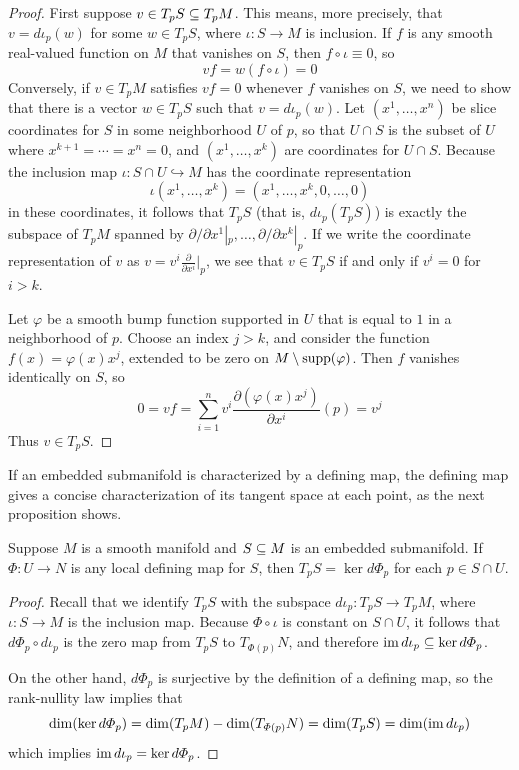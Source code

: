 \begin{proof}
First suppose $v\in T_pS\subseteq T_pM$. This means, more precisely, that $v=d\iota_p(w)$ for some $w\in T_pS$, where $\iota:S\to M$ is inclusion. If $f$ is any smooth real-valued function on $M$ that vanishes on $S$, then $f\circ\iota\equiv 0$, so
\[vf=w(f\circ\iota)=0\]
Conversely, if $v\in T_pM$ satisfies $vf=0$ whenever $f$ vanishes on $S$, we need to
show that there is a vector $w\in T_pS$ such that $v=d\iota_p(w)$. Let $(x^1,\dots,x^n)$ be slice coordinates for $S$ in some neighborhood $U$ of $p$, so that $U\cap S$ is the subset of $U$ where $x^{k+1}=\cdots=x^n=0$, and $(x^1,\dots,x^k)$ are coordinates for $U\cap S$. Because the inclusion map $\iota:S\cap U\hookrightarrow M$ has the coordinate representation
\[\iota(x^1,\dots,x^k)=(x^1,\dots,x^k,0,\dots,0)\]
in these coordinates, it follows that $T_pS$ (that is, $d\iota_p(T_pS)$) is exactly the subspace of $T_pM$ spanned by $\partial/\partial x^1|_p,\dots,\partial/\partial x^k|_p$. If we write the coordinate representation
of $v$ as $v=v^i\frac{\partial}{\partial x^i}|_p$, we see that $v\in T_pS$ if and only if $v^i=0$ for $i>k$.\par
Let $\varphi$ be a smooth bump function supported in $U$ that is equal to $1$ in a neighborhood of $p$. Choose an index $j>k$, and consider the function $f(x)=\varphi(x)x^j$, extended to be zero on $M\setminus\mathrm{supp}(\varphi)$. Then $f$ vanishes identically on $S$, so
\[0=vf=\sum_{i=1}^{n}v^i\frac{\partial(\varphi(x)x^j)}{\partial x^i}(p)=v^j\]
Thus $v\in T_pS$.
\end{proof}
If an embedded submanifold is characterized by a defining map, the defining map gives a concise characterization of its tangent space at each point, as the next
proposition shows.
\begin{proposition}\label{tangent space level set}
Suppose $M$ is a smooth manifold and $S\subseteq M$ is an embedded submanifold. If $\varPhi:U\to N$ is any local defining map for $S$, then $T_pS=\ker d\varPhi_p$ for each $p\in S\cap U$.
\end{proposition}
\begin{proof}
Recall that we identify $T_pS$ with the subspace $d\iota_p:T_pS\to T_pM$, where $\iota:S\to M$ is the inclusion map. Because $\varPhi\circ\iota$ is constant on $S\cap U$, it follows that $d\varPhi_p\circ d\iota_p$ is the zero map from $T_pS$ to $T_{\varPhi(p)}N$, and therefore $\mathrm{im}\, d\iota_p\subseteq\ker d\varPhi_p$.\par
On the other hand, $d\varPhi_p$ is surjective by the definition of a defining map, so the rank-nullity law implies that
\[\dim(\ker d\varPhi_p)=\dim(T_pM)-\dim(T_{\varPhi(p)}N)=\dim(T_pS)=\dim(\mathrm{im}\, d\iota_p)\]
which implies $\mathrm{im}\, d\iota_p=\ker d\varPhi_p$.
\end{proof}
